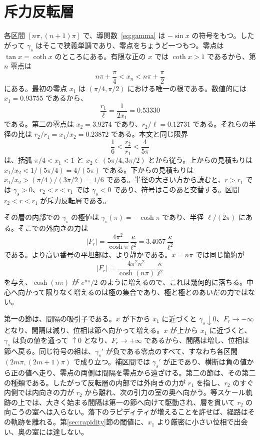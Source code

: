 \documentclass[a4paper]{article}
\begin{document}
\section{斥力反転層}
\label{sec:layer}

各区間 \([n\pi,(n+1)\pi]\) で、導関数~\eqref{eq:gamma} は \(-\sin x\) の符号をもつ。したがって \(\gamma_s\) はそこで狭義単調であり、零点をちょうど一つもつ。零点は \(\tan x=\coth x\) のところにある。有限な正の \(x\) では \(\coth x>1\) であるから、第 \(n\) 零点は
\[
n\pi+\frac{\pi}{4}<x_n<n\pi+\frac{\pi}{2}
\]
にある。最初の零点 \(x_1\) は \((\pi/4,\pi/2)\) における唯一の根である。数値的には \(x_1=0.93755\) であるから、
\[
\frac{r_1}{\ell}=\frac{1}{2x_1}=0.53330
\]
である。第二の零点は \(x_2=3.9274\) であり、\(r_2/\ell=0.12731\) である。それらの半径の比は \(r_2/r_1=x_1/x_2=0.23872\) である。本文と同じ限界
\[
\frac16<\frac{r_2}{r_1}<\frac{4}{5\pi}
\]
は、括弧 \(\pi/4<x_1<1\) と \(x_2\in(5\pi/4,3\pi/2)\) とから従う。上からの見積もりは \(x_1/x_2<1/(5\pi/4)=4/(5\pi)\) である。下からの見積もりは \(x_1/x_2>(\pi/4)/(3\pi/2)=1/6\) である。半径の大きい方から読むと、\(r>r_1\) では \(\gamma_s>0\)、\(r_2<r<r_1\) では \(\gamma_s<0\) であり、符号はこのあと交替する。区間 \(r_2<r<r_1\) が斥力反転層である。

その層の内部での \(\gamma_s\) の極値は \(\gamma_s(\pi)=-\cosh\pi\) であり、半径 \(\ell/(2\pi)\) にある。そこでの外向きの力は
\begin{equation}
\label{eq:plateau}
|F_r|
  =\frac{4\pi^{2}}{\cosh\pi}\,\frac{\kappa}{\ell^{2}}
  =3.4057\,\frac{\kappa}{\ell^{2}}
\end{equation}
である。より高い番号の平坦部は、より静かである。\(x=n\pi\) では同じ簡約が
\[
|F_r|=\frac{4\pi^{2} n^{2}}{\cosh(n\pi)}\,\frac{\kappa}{\ell^{2}}
\]
を与え、\(\cosh(n\pi)\) が \(e^{n\pi}/2\) のように増えるので、これは幾何的に落ちる。中心へ向かって限りなく増えるのは極の集合であり、極と極とのあいだの力ではない。

第一の節は、間隔の吸引子である。\(x\) が下から \(x_1\) に近づくと \(\gamma_s\downarrow 0\)、\(F_r\to-\infty\) となり、間隔は減り、位相は節へ向かって増える。\(x\) が上から \(x_1\) に近づくと、\(\gamma_s\) は負の値を通って \(\uparrow 0\) となり、\(F_r\to+\infty\) であるから、間隔は増し、位相は節へ戻る。同じ符号の組は、\(\gamma_s'\) が負である零点のすべて、すなわち各区間 \((2m\pi,(2m+1)\pi)\) で成り立つ。補区間では \(\gamma_s'\) が正であり、横断は負の値から正の値へ走り、零点の両側は間隔を零点から遠ざける。第二の節は、その第二の種類である。したがって反転層の内部では外向きの力が \(r_1\) を指し、\(r_2\) のすぐ内側では内向きの力が \(r_2\) から離れ、次の引力の室の奥へ向かう。等スケール軌跡の上では、大きく始まる間隔は第一の節へ向けて駆動され、層を貫いて \(r_2\) の向こうの室へは入らない。落下のラピディティが増えることを許せば、経路はその軌跡を離れる。第\ref{sec:rapidity}節の閾値に、\(x_1\) より厳密に小さい位相で出会い、奥の室には達しない。
\end{document}
